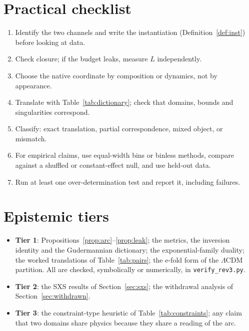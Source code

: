 \documentclass[11pt]{article}
\theoremstyle{definition}
\theoremstyle{remark}
\begin{document}
\section{Practical checklist}\label{sec:checklist}

\begin{enumerate}\sloppy
\item Identify the two channels and write the instantiation (Definition~\ref{def:inst})
before looking at data.
\item Check closure; if the budget leaks, measure $L$ independently.
\item Choose the native coordinate by composition or dynamics, not by appearance.
\item Translate with Table~\ref{tab:dictionary}; check that domains, bounds and
singularities correspond.
\item Classify: exact translation, partial correspondence, mixed object, or mismatch.
\item For empirical claims, use equal-width bins or binless methods, compare against a
shuffled or constant-effect null, and use held-out data.
\item Run at least one over-determination test and report it, including failures.
\end{enumerate}

\section{Epistemic tiers}\label{sec:tiers}
\begin{itemize}
\item \textbf{Tier 1}: Propositions~\ref{prop:arc}--\ref{prop:leak}; the metrics, the
inversion identity and the Gudermannian dictionary; the exponential-family duality; the
worked translations of Table~\ref{tab:pairs}; the e-fold form of the $\Lambda$CDM
partition. All are checked, symbolically or numerically, in \texttt{verify\_rev3.py}.
\item \textbf{Tier 2}: the SXS results of Section~\ref{sec:sxs}; the withdrawal analysis of
Section~\ref{sec:withdrawn}.
\item \textbf{Tier 3}: the constraint-type heuristic of Table~\ref{tab:constraints}; any
claim that two domains share physics because they share a reading of the arc.
\end{itemize}
\end{document}
